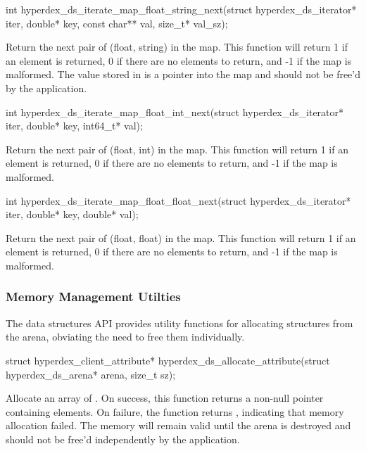 \funcsep
\begin{ccode}
int hyperdex_ds_iterate_map_float_string_next(struct hyperdex_ds_iterator* iter,
                                              double* key,
                                              const char** val, size_t* val_sz);
\end{ccode}
\funcdesc Return the next pair of (float, string) in the map.  This function
will return 1 if an element is returned, 0 if there are no elements to return,
and -1 if the map is malformed.  The value stored in  is a pointer
into the map and should not be free'd by the application.

\funcsep
\begin{ccode}
int hyperdex_ds_iterate_map_float_int_next(struct hyperdex_ds_iterator* iter,
                                           double* key, int64_t* val);
\end{ccode}
\funcdesc Return the next pair of (float, int) in the map.  This function will
return 1 if an element is returned, 0 if there are no elements to return, and -1
if the map is malformed.

\funcsep
\begin{ccode}
int hyperdex_ds_iterate_map_float_float_next(struct hyperdex_ds_iterator* iter,
                                             double* key, double* val);
\end{ccode}
\funcdesc Return the next pair of (float, float) in the map.  This function will
return 1 if an element is returned, 0 if there are no elements to return, and -1
if the map is malformed.

\subsubsection{Memory Management Utilties}

The data structures API provides utility functions for allocating structures
from the arena, obviating the need to free them individually.

\funcsep
\begin{ccode}
struct hyperdex_client_attribute*
hyperdex_ds_allocate_attribute(struct hyperdex_ds_arena* arena, size_t sz);
\end{ccode}
\funcdesc Allocate an array of .  On
success, this function returns a non-null pointer containing  elements.
On failure, the function returns , indicating that memory allocation
failed.  The memory will remain valid until the arena is destroyed and should
not be free'd independently by the application.

